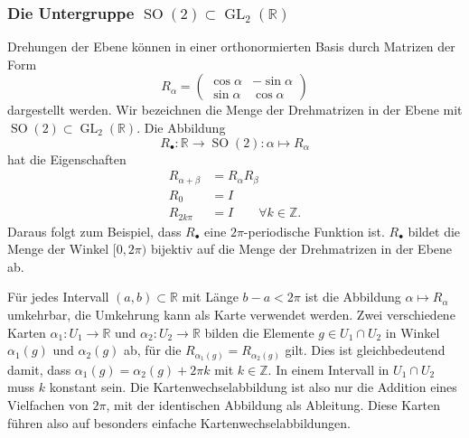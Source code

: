 \subsubsection{Die Untergruppe
$\operatorname{SO}(2)\subset \operatorname{GL}_2(\mathbb{R})$}
Drehungen der Ebene können in einer orthonormierten Basis durch
Matrizen der Form
\begin{equation}
R_{\alpha}
=
\begin{pmatrix}
\cos\alpha&-\sin\alpha\\
\sin\alpha& \cos\alpha
\end{pmatrix}
\label{buch:lie:eqn:ralphadefinition}
\end{equation}
dargestellt werden.
Wir bezeichnen die Menge der Drehmatrizen in der Ebene mit
$\operatorname{SO}(2)\subset\operatorname{GL}_2(\mathbb{R})$.
Die Abbildung
\[
R_{\bullet}
\colon
\mathbb{R}\to \operatorname{SO}(2)
:
\alpha \mapsto R_{\alpha}
\]
hat die Eigenschaften
\begin{equation}
\begin{aligned}
R_{\alpha+\beta}&= R_{\alpha}R_{\beta}
\\
R_0&=I
\\
R_{2k\pi}&=I\qquad \forall k\in\mathbb{Z}.
\end{aligned}
\label{buch:lie:so2matrizen}
\end{equation}
Daraus folgt zum Beispiel, dass $R_{\bullet}$ eine $2\pi$-periodische
Funktion ist.
$R_{\bullet}$ bildet die Menge der Winkel $[0,2\pi)$ bijektiv auf
die Menge der Drehmatrizen in der Ebene ab.

Für jedes Intervall $(a,b)\subset\mathbb{R}$ mit Länge
$b-a < 2\pi$ ist die Abbildung $\alpha\mapsto R_{\alpha}$ umkehrbar,
die Umkehrung kann als Karte verwendet werden.
Zwei verschiedene Karten $\alpha_1\colon U_1\to\mathbb{R}$ und
$\alpha_2\colon U_2\to\mathbb{R}$ bilden die Elemente $g\in U_1\cap U_2$
in Winkel $\alpha_1(g)$ und $\alpha_2(g)$ ab, für die 
$R_{\alpha_1(g)}=R_{\alpha_2(g)}$ gilt.
Dies ist gleichbedeutend damit, dass $\alpha_1(g)=\alpha_2(g)+2\pi k$
mit $k\in \mathbb{Z}$.
In einem Intervall in $U_1\cap U_2$ muss $k$ konstant sein.
Die Kartenwechselabbildung ist also nur die Addition eines Vielfachen
von $2\pi$, mit der identischen Abbildung als Ableitung.
Diese Karten führen also auf besonders einfache Kartenwechselabbildungen.

